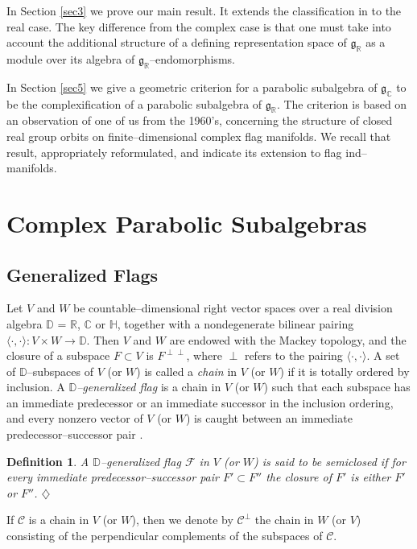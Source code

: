 \documentclass[oneside,leqno,11pt]{article}
\def\gg{\mathfrak{g}}
\def\C{\mathbb{C}}
\def\D{\mathbb{D}}
\def\H{\mathbb{H}}
\def\R{\mathbb{R}}
\def\cC{\mathcal{C}}
\def\cF{\mathcal{F}}
\newtheorem{definition}[equation]{Definition}
\begin{document}
In Section \ref{sec3} we prove our main result.  It extends
the classification in \cite{DC2} to the real case.  The key difference from the complex case is that one must take into account the additional structure of a defining representation space of $\gg_\R$ as a module over its algebra of $\gg_\R$--endomorphisms.

In Section \ref{sec5} we give a geometric
criterion for a parabolic subalgebra of $\gg_\C$ to be the complexification
of a parabolic subalgebra of $\gg_\R$.  The criterion is based on an
observation of one of us from the 1960's, concerning the structure of
closed real group orbits on finite--dimensional complex flag manifolds.
We recall that result, appropriately reformulated, and indicate its 
extension to flag ind--manifolds.


\section{Complex Parabolic Subalgebras}\label{sec2}
\setcounter{equation}{0}

\subsection{Generalized Flags}

Let $V$ and $W$ be countable--dimensional right vector spaces over a real division algebra 
$\D$ = $\R$, $\C$ or $\H$, together with
a nondegenerate bilinear pairing
$\langle \cdot , \cdot \rangle : V \times W \rightarrow \D$.  Then $V$ and $W$ are endowed with the Mackey topology, and the closure of a subspace $F \subset V$ is $F^{\perp \perp}$, where $\perp$
refers to the pairing $\langle \cdot , \cdot \rangle$.  
A set of $\D$--subspaces of $V$ (or $W$) is called a \emph{chain} in $V$ (or $W$) if it is 
totally ordered by inclusion.  A \emph{$\D$--generalized flag} is a chain in 
$V$ (or $W$) such that each subspace has an immediate predecessor or an immediate 
successor in the inclusion ordering, and every nonzero vector of $V$ (or $W$) is 
caught between an immediate predecessor--successor pair \cite{DP1}.

\begin{definition} {\rm \cite{DC2}}
A $\D$--generalized flag $\cF$ in $V$ (or $W$) is said to be \emph{semiclosed}
if for every immediate predecessor--successor pair $F' \subset F''$ the closure
of $F'$ is either $F'$ or $F''$. \hfill $\diamondsuit$
\end{definition}


If $\cC$ is a chain in $V$ (or $W$), then we denote by $\cC^\perp$ the chain in $W$ (or $V$)
consisting of the perpendicular complements of the subspaces of $\cC$.
\end{document}
